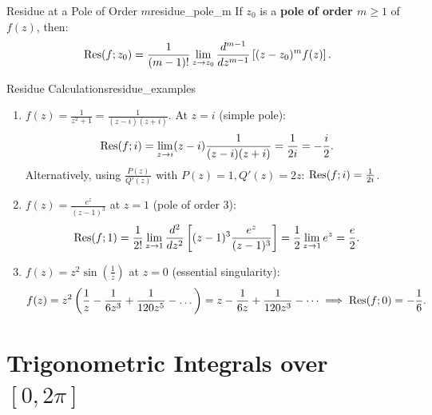 \begin{proposition}{Residue at a Pole of Order $m$}{residue_pole_m}
If $z_0$ is a \textbf{pole of order $m \ge 1$} of $f(z)$, then:
\begin{equation}
\operatorname{Res}(f; z_0) = \frac{1}{(m - 1)!} \lim_{z \to z_0} \frac{d^{m-1}}{dz^{m-1}} \left[ (z - z_0)^m f(z) \right].
\end{equation}
\end{proposition}

\begin{example}{Residue Calculations}{residue_examples}
\begin{enumerate}
    \item $f(z) = \frac{1}{z^2 + 1} = \frac{1}{(z-i)(z+i)}$. At $z = i$ (simple pole):
    \begin{equation}
    \operatorname{Res}(f; i) = \lim_{z \to i} (z - i)\frac{1}{(z - i)(z + i)} = \frac{1}{2i} = -\frac{i}{2}.
    \end{equation}
    Alternatively, using $\frac{P(z)}{Q'(z)}$ with $P(z) = 1, Q'(z) = 2z$: $\operatorname{Res}(f; i) = \frac{1}{2i}$.
    \item $f(z) = \frac{e^z}{(z - 1)^3}$ at $z = 1$ (pole of order 3):
    \begin{equation}
    \operatorname{Res}(f; 1) = \frac{1}{2!} \lim_{z \to 1} \frac{d^2}{dz^2}\left[ (z - 1)^3 \frac{e^z}{(z - 1)^3} \right] = \frac{1}{2} \lim_{z \to 1} e^z = \frac{e}{2}.
    \end{equation}
    \item $f(z) = z^2 \sin\left(\frac{1}{z}\right)$ at $z = 0$ (essential singularity):
    \begin{equation}
    f(z) = z^2 \left( \frac{1}{z} - \frac{1}{6z^3} + \frac{1}{120z^5} - \dots \right) = z - \frac{1}{6z} + \frac{1}{120z^3} - \dots \implies \operatorname{Res}(f; 0) = -\frac{1}{6}.
    \end{equation}
\end{enumerate}
\end{example}


\section{Trigonometric Integrals over \texorpdfstring{$[0, 2\pi]$}{[0, 2pi]}}

